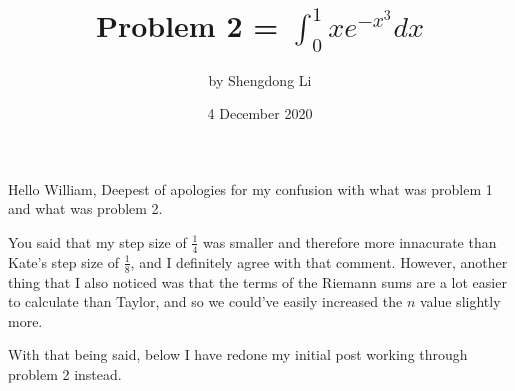 \documentclass[12pt]{article}
\begin{document}
\title{Problem 2 = $\int_{0}^{1}xe^{-x^{3}}dx$}
\author{by Shengdong Li}
\date{4 December 2020}
\maketitle

Hello William, 
Deepest of apologies for my confusion with what was problem 1 and what was problem 2. 

You said that my step size of $\frac{1}{4}$ was smaller and therefore more innacurate than Kate's step size of $\frac{1}{8}$, and I definitely agree with that comment. However, another thing that I also noticed was that the terms of the Riemann sums are a lot easier to calculate than Taylor, and so we could've easily increased the $n$ value slightly more. 

With that being said, below I have redone my initial post working through problem 2 instead.
\end{document}
